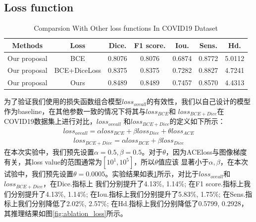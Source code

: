 \documentclass[UTF8]{article} %
\begin{document}
  \subsection{Loss function}
  \begin{table}[htbp]
    \vspace{-2mm}
    \begin{center}\small
        \label{loss-table}
        \begin{tabular}{ccccccc}
            \toprule
            Methods & Loss & Dice. & F1 score. & Iou. & Sens. & Hd.\\
            \midrule
            Our proposal & BCE          & 0.8076 & 0.8076 & 0.6874 & 0.8772 & 5.0112\\
            Our proposal & BCE+DiceLoss & 0.8375 & 0.8375 & 0.7282 & 0.8827 & 4.7241\\
            Our proposal & Ours         & 0.8489 & 0.8489 & 0.7457 & 0.8570 & 4.4313\\
        \bottomrule    
        \end{tabular}


        \caption{Comparsion With Other loss functions In COVID19\cite{covid19} Dataset}
    \end{center}
    \vspace{-4mm}
  \end{table}
  为了验证我们使用的损失函数组合模型\(loss_{oveall}\)的有效性，我们以自己设计的模型作为baseline，在其他参数一致的情况下将其与\(loss_{BCE}\)和
  \(loss_{BCE+Dice}\)在COVID19数据集上进行对比，\(loss_{oveall}\)
  和\(loss_{BCE+Dice}\)的定义如下所示：
  \begin{align}
    loss_{oveall} = \alpha loss_{BCE} + \beta loss_{Dice} + \theta loss_{ACE}
  \end{align}
  \begin{align}
    loss_{BCE+Dice} = \alpha loss_{BCE} + \beta loss_{Dice}
  \end{align}
  在本次实验中，我们预先设置\(\alpha=0.5, \beta=0.5\)。对于\(\theta\)，因为ACEloss与图像梯度有关，其loss value的范围通常为\([10^1, 10^5]\)，所以\(\theta\)值应该
  显著小于\(\alpha, \beta\)，在本次试验中，我们预先设置\(\theta=0.0005\)。实验结果如表\ref{loss-table}所示，对比于\(loss_{oveall}\)和\(loss_{BCE+Dice}\)，在Dice.指标上
  我们分别提升了4.13\%, 1.14\%; 在F1 score.指标上我们分别提升了4.13\%, 1.14\%; 在Iou.指标上我们分别提升了5.83\%, 1.75\%; 在Sens.指标上我们分别降低了2.02\%, 2.57\%;
  在Hd.指标上我们分别降低了0.5799, 0.2928，其推理结果如图\ref{fig:ablation_loss}所示。
\end{document}
